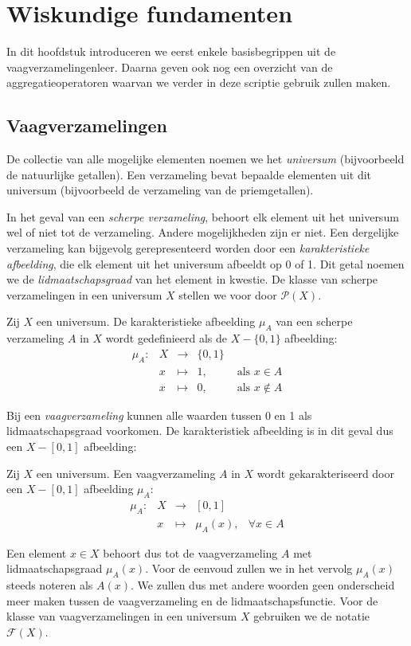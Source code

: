 \chapter{Wiskundige fundamenten}

In dit hoofdstuk introduceren we eerst enkele basisbegrippen uit de vaagverzamelingenleer. 
Daarna geven ook nog een overzicht van de aggregatieoperatoren waarvan
we verder in deze scriptie gebruik zullen maken.

\section{Vaagverzamelingen}

De collectie van alle mogelijke elementen noemen we het \emph{universum} (bijvoorbeeld de
natuurlijke getallen). Een verzameling bevat bepaalde elementen uit dit universum (bijvoorbeeld de 
verzameling van de priemgetallen). 

In het geval van een \emph{scherpe verzameling}, behoort elk 
element uit het universum wel of niet tot de verzameling. Andere mogelijkheden zijn er
niet. Een dergelijke verzameling kan bijgevolg 
gerepresenteerd worden door een \emph{karakteristieke afbeelding}, die elk element uit het 
universum afbeeldt op 0 of 1. Dit getal noemen we de \emph{lidmaatschapsgraad} van het element 
in kwestie. De klasse van scherpe verzamelingen in een universum $X$ stellen we voor door 
$\mathcal{P}(X)$.
\begin{definitie}
Zij $X$ een universum. De karakteristieke afbeelding $\mu_A$ van een scherpe verzameling $A$ in $X$
wordt gedefinieerd als de $X - \{0,1\}$ afbeelding:
$$
\begin{array}{lllll}
\mu_A: 	& X & \to 		& \{0,1\}	& \\
		& x & \mapsto 	& 1,		& \textrm{ als } x \in A \\
		& x & \mapsto 	& 0,		& \textrm{ als } x \notin A
\end{array}
$$
\end{definitie}

Bij een \emph{vaagverzameling} kunnen alle waarden tussen 0 en 1 als lidmaatschapsgraad 
voorkomen. De karakteristiek afbeelding is in dit geval dus een $X - [0,1]$ afbeelding:
\begin{definitie}
Zij $X$ een universum. Een vaagverzameling $A$ in $X$ wordt gekarakteriseerd door een $X - [0,1]$
afbeelding  $\mu_A$:
$$
\begin{array}{lllll}
\mu_A: 	& X & \to 		& [0,1]	& \\
		& x & \mapsto 	& \mu_A(x),		& \forall x \in A
\end{array}
$$
\end{definitie}
\noindent
Een element $x \in X$ behoort dus tot de vaagverzameling $A$ met lidmaatschapsgraad $\mu_A(x)$.
Voor de eenvoud zullen we in het vervolg $\mu_A(x)$ steeds noteren als $A(x)$. We zullen dus 
met andere woorden geen onderscheid meer maken tussen de vaagverzameling en de 
lidmaatschapsfunctie. Voor de klasse van vaagverzamelingen in een universum $X$ gebruiken we
de notatie $\mathcal{F}(X)$.

